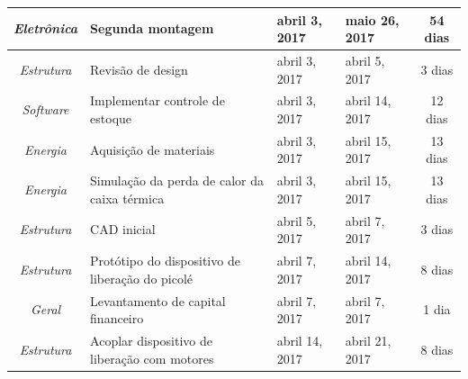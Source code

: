 \begin{longtable}{|c|m{6.5cm}|m{3.2cm}|m{3.2cm}|c|}
\textit{Eletrônica}                                                       & Segunda montagem                                     & abril 3, 2017                        & maio 26, 2017                     & 54 dias                               \\ \hline
\textit{Estrutura}                                                        & Revisão de design                                    & abril 3, 2017                        & abril 5, 2017                     & 3 dias                                \\ \hline
\textit{Software}                                                         & Implementar controle de estoque                      & abril 3, 2017                        & abril 14, 2017                    & 12 dias                               \\ \hline
\textit{Energia}                                                          & Aquisição de materiais                               & abril 3, 2017                        & abril 15, 2017                    & 13 dias                               \\ \hline
\textit{Energia}                                                          & Simulação da perda de calor da caixa térmica         & abril 3, 2017                        & abril 15, 2017                    & 13 dias                               \\ \hline
\textit{Estrutura}                                                        & CAD inicial                                          & abril 5, 2017                        & abril 7, 2017                     & 3 dias                                \\ \hline
\textit{Estrutura}                                                        & Protótipo do dispositivo de liberação do picolé      & abril 7, 2017                        & abril 14, 2017                    & 8 dias                                \\ \hline
\textit{Geral}                                                            & Levantamento de capital financeiro                   & abril 7, 2017                        & abril 7, 2017                     & 1 dia                                 \\ \hline
\textit{Estrutura}                                                        & Acoplar dispositivo de liberação com motores         & abril 14, 2017                       & abril 21, 2017                    & 8 dias                                \\ \hline

\end{longtable}
